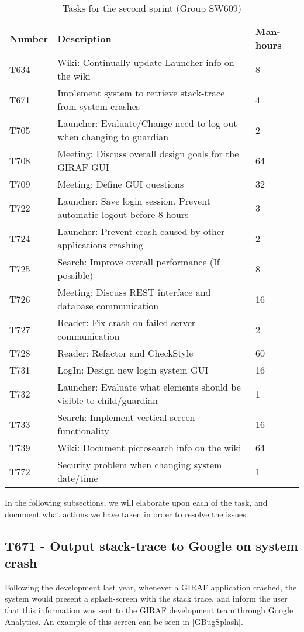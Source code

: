 \begin{table}[H]
\centering
\begin{tabular}{|l|l|l|}
\hline
Number	& Description & Man-hours												\\\hline
T634  	& Wiki: Continually update Launcher info on the wiki & 8\\\hline 
T671    & Implement system to retrieve stack-trace from system crashes & 4
\\\hline 
T705	& Launcher: Evaluate/Change need to log out when changing  to guardian
& 2 \\\hline 
T708    & Meeting: Discuss overall design goals for the GIRAF GUI & 64\\\hline
T709	& Meeting: Define GUI questions & 32 \\\hline 
T722   	& Launcher: Save login session. Prevent automatic logout before 8 hours
&3 \\\hline 
T724   	& Launcher: Prevent crash caused by other applications
crashing & 2 \\\hline 
T725  	& Search: Improve overall performance (If possible)	& 8 \\\hline 
T726    & Meeting: Discuss REST interface and database communication & 16
\\\hline 
T727    & Reader: Fix crash on failed server communication  & 2				\\\hline 
T728	& Reader: Refactor and CheckStyle  & 60\\\hline
T731    & LogIn: Design new login system GUI & 16     			\\\hline
T732    & Launcher: Evaluate what elements should be visible to
child/guardian & 1\\\hline 
T733    & Search: Implement vertical screen functionality & 16   			\\\hline 
T739    & Wiki: Document pictosearch info on the wiki & 64	\\\hline
T772    & Security problem when changing system date/time & 1 \\\hline
\end{tabular}
\caption{Tasks for the second sprint (Group SW609)} 
\label{SprintTwoTasks}    
\end{table} 

In the following subsections, we will elaborate upon each of the task, and
document what actions we have taken in order to resolve the issues.

\newpage
\subsection{T671 - Output stack-trace to Google on system crash}
Following the development last year, whenever a GIRAF application crashed, the
system would present a splash-screen with the stack trace, and inform the user
that this information was sent to the GIRAF development team through Google
Analytics. An example of this screen can be seen in \autoref{GBugSplash}.

